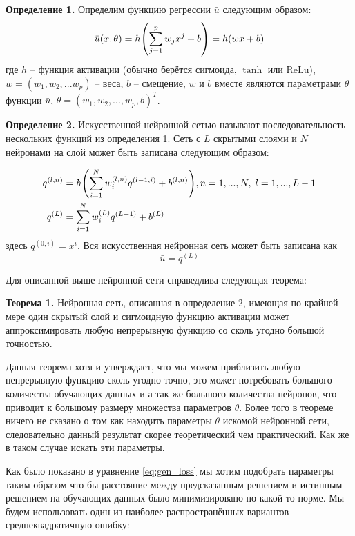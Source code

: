 \documentclass[a4paper,14pt]{extarticle} %
\begin{document}
\textbf{Определение 1.} Определим функцию регрессии $\bar{u}$ следующим образом: 
\begin{equation}
    \bar{u}(x, \theta) = h{\left( \sum_{j=1}^p w_j x^j + b \right)} = h(wx+b)
\end{equation}
где $h$ -- функция активации (обычно берётся сигмоида, $\tanh$ или ReLu), $w = (w_1, w_2, ... w_p)$ -- веса, $b$ -- смещение, $w$ и $b$ вместе являются параметрами $\theta$ функции $\bar{u}$, $\theta = (w_1, w_2, ..., w_p, b)^T$. %

\textbf{Определение 2.} Искусственной нейронной сетью называют последовательность нескольких функций из определения 1. Сеть с $L$ скрытыми слоями и $N$ нейронами на слой может быть записана следующим образом:

\begin{equation}
    \begin{aligned}
        q^{(l, n)} &= h{\left( \sum_{i=1}^N w_i^{(l,n)}q^{(l-1,i)}+b^{(l,n)} \right)}, n=1,...,N,\; l=1,...,L-1\\
        q^{(L)} &={\sum_{i=1}^N w_i^{(L)}q^{(L-1)}+b^{(L)}}
    \end{aligned}
\end{equation}
здесь $q^{(0, i)}=x^i$. Вся искусственная нейронная сеть может быть записана как
\begin{equation}
    \bar{u} = q^{(L)}
\end{equation}

Для описанной выше нейронной сети справедлива следующая теорема: 

\textbf{Теорема 1.} Нейронная сеть, описанная в определение 2, имеющая по крайней мере один скрытый слой и сигмоидную функцию активации может аппроксимировать любую непрерывную функцию со сколь угодно большой точностью. 

Данная теорема хотя и утверждает, что мы можем приблизить любую непрерывную функцию сколь угодно точно, это может потребовать большого количества обучающих данных и а так же большого количества нейронов, что приводит к большому размеру множества параметров $\theta$. Более того в теореме ничего не сказано о том как находить параметры $\theta$ искомой нейронной сети, следовательно данный результат скорее теоретический чем практический. Как же в таком случае искать эти параметры.

Как было показано в уравнение \eqref{eq:gen_loss} мы хотим подобрать параметры таким образом что бы расстояние между предсказанным решением и истинным решением на обучающих данных было минимизировано по какой то норме. Мы будем использовать один из наиболее распространённых вариантов -- среднеквадратичную ошибку:
\end{document}
